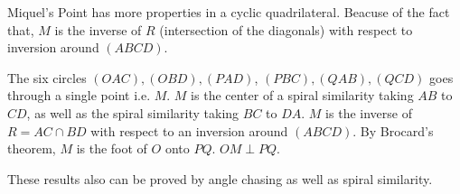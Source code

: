 \begin{theorem}
Miquel's Point has more properties in a cyclic quadrilateral. Beacuse of the fact that, $M$ is the inverse of $R$ (intersection of the diagonals) with respect to inversion around $(ABCD)$. 
\begin{itemize}
	\ii %
	The six circles $(OAC), (OBD), (P AD)$, $(P BC), (QAB),(QCD)$ goes through a single point i.e. $M$.
	\ii $M$ is the center of a spiral similarity taking $AB$ to $CD$, as well as the spiral similarity taking $BC$ to $DA$.
	\ii $M$ is the inverse of $R = AC \cap BD$ with respect to an inversion around $(ABCD)$. By Brocard’s theorem, $M$ is the foot of $O$ onto $PQ$.
	\ii $OM\perp PQ$.
\end{itemize}
\end{theorem}
These results also can be proved by angle chasing as well as spiral similarity. 










